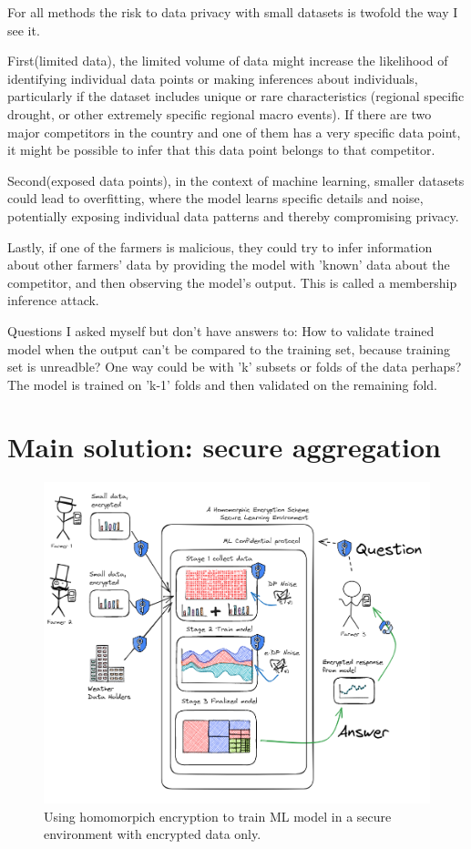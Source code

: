 For all methods the risk to data privacy with small datasets is twofold the way I see it.

First(limited data), the limited volume of data might increase the likelihood
of identifying individual data points or making inferences about individuals, particularly if the dataset includes unique or rare
characteristics (regional specific drought, or other extremely specific regional macro events). If there are two major competitors in
the country and one of them has a very specific data point, it might be possible to infer that this data point belongs to that competitor.

Second(exposed data points), in the context of machine learning, smaller datasets could lead to overfitting,
where the model learns specific details and noise, potentially exposing individual data patterns and thereby compromising privacy.

Lastly, if one of the farmers is malicious, they could try to infer information about other farmers' data by providing the model with
'known' data about the competitor, and then observing the model's output. This is called a membership inference attack.

Questions I asked myself but don't have answers to: How to validate trained model when the output can't be compared to the training set,
because training
set
is
unreadble? One way could be
with 'k' subsets or folds of the data perhaps? The model is trained on 'k-1' folds and then validated on the remaining fold.

\section{Main solution: secure aggregation}

\begin{figure}[!htbp]
  \centering
  \includegraphics[width=\textwidth]{assets/img_7}
  \caption{Using homomorpich encryption to train ML model in a secure environment with encrypted data only.}
  \label{fig:img_7}
\end{figure}

